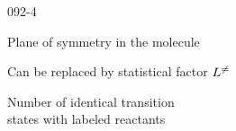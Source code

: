 \begin{mitframe}{092-4}
        \begin{listtwo}
        	\item Plane of symmetry in the molecule
            \item Can be replaced by statistical factor $\length^{\neq}$
            \begin{listtwo}
            		\item Number of identical transition\\
                    states with labeled reactants
            \end{listtwo}
        \end{listtwo}
\end{mitframe}